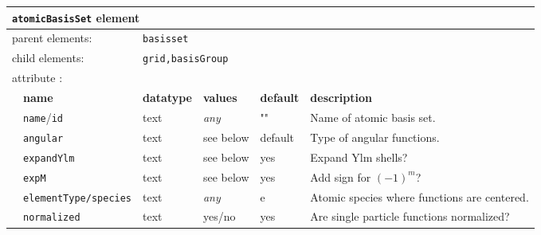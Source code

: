 \begin{table}[h]
\begin{center}
\begin{tabularx}{\textwidth}{l l l l l l }
\hline
\multicolumn{6}{l}{\texttt{atomicBasisSet} element} \\
\hline
\multicolumn{2}{l}{parent elements:} & \multicolumn{4}{l}{\texttt{basisset}}\\
\multicolumn{2}{l}{child  elements:} & \multicolumn{4}{l}{\texttt{grid,basisGroup}}\\
\multicolumn{2}{l}{attribute      :} & \multicolumn{4}{l}{}\\
   &   \bfseries name              & \bfseries datatype & \bfseries values & \bfseries default   & \bfseries description \\
   &   \texttt{name}/\texttt{id}   &  text              &  \textit{any}    &  ""                & Name of atomic basis set. \\
   &   \texttt{angular}               &  text              &  see below    &  default       & Type of angular functions.  \\
   &   \texttt{expandYlm}         &  text              &  see below   &  yes                &  Expand Ylm shells? \\  
   &   \texttt{expM}                  &  text              &  see below   &  yes                &  Add sign for $(-1)^{m}$? \\  
   &   \texttt{elementType/species}   &  text  &  \textit{any}    &  e                &  Atomic species where functions are centered. \\
   &   \texttt{normalized}         &  text              &  yes/no   &  yes                &  Are single particle functions normalized? \\   
  \hline
\end{tabularx}
\end{center}
\end{table}

